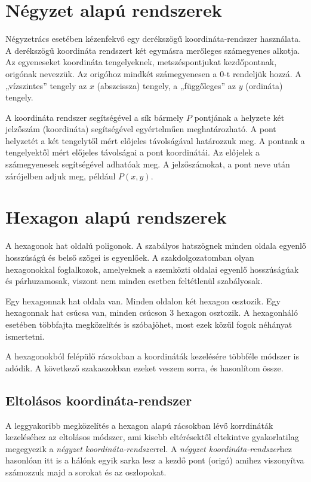 
\section{Négyzet alapú rendszerek}

Négyzetrács esetében kézenfekvő egy derékszögű koordináta-rendszer használata. A derékszögű koordináta rendszert két egymásra merőleges számegyenes alkotja. Az egyeneseket koordináta tengelyeknek, metszéspontjukat kezdőpontnak, origónak nevezzük. Az origóhoz mindkét számegyenesen a $0$-t rendeljük hozzá. A „vízszintes” tengely az $x$ (abszcissza) tengely, a „függőleges” az $y$ (ordináta) tengely.

A koordináta rendszer segítségével a sík bármely $P$ pontjának a helyzete két jelzőszám (koordináta) segítségével egyértelműen meghatározható. A pont helyzetét a két tengelytől mért előjeles távolságával határozzuk meg. A pontnak a tengelyektől mért előjeles távolságai a pont koordinátái. Az előjelek a számegyenesek segítségével adhatóak meg. A jelzőszámokat, a pont neve után zárójelben adjuk meg, például $P(x, y)$.

\section{Hexagon alapú rendszerek}

A hexagonok hat oldalú poligonok. A szabályos hatszögnek minden oldala egyenlő hosszúságú és belső szögei is egyenlőek. A szakdolgozatomban olyan hexagonokkal foglalkozok, amelyeknek a szemközti oldalai egyenlő hosszúságúak és párhuzamosak, viszont nem minden esetben feltétlenül szabályosak.

Egy hexagonnak hat oldala van. Minden oldalon két hexagon osztozik. Egy hexagonnak hat csúcsa van, minden csúcson 3 hexagon osztozik. A hexagonháló esetében többfajta megközelítés is szóbajöhet, most ezek közül fogok néhányat ismertetni.

A hexagonokból felépülő rácsokban a koordináták kezelésére többféle módszer is adódik. A következő szakaszokban ezeket veszem sorra, és hasonlítom össze.

\subsection{Eltolásos koordináta-rendszer}

A leggyakoribb megközelítés a hexagon alapú rácsokban lévő korrdináták kezeléséhez az eltolásos módszer, ami kisebb eltérésektől eltekintve gyakorlatilag megegyezik a \textit{négyzet koordináta-rendszer}rel. A \textit{négyzet koordináta-rendszer}hez hasonlóan itt is a hálónk egyik sarka lesz a kezdő pont (origó) amihez viszonyítva számozzuk majd a sorokat és az oszlopokat.

